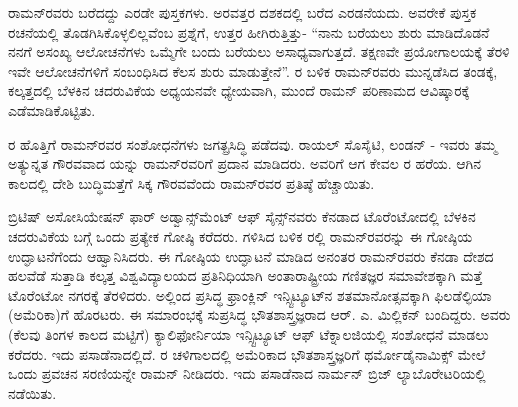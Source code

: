 ರಾಮನ್‍ರವರು ಬರೆದದ್ದು ಎರಡೇ ಪುಸ್ತಕಗಳು. ಅರವತ್ತರ ದಶಕದಲ್ಲಿ ಬರೆದ \textit{} ಎರಡನೆಯದು. ಅವರೇಕೆ ಪುಸ್ತಕ ರಚನೆಯಲ್ಲಿ ತೊಡಗಿಸಿಕೊಳ್ಳಲಿಲ್ಲವೆಂಬ ಪ್ರಶ್ನೆಗೆ, ಉತ್ತರ ಹೀಗಿರುತ್ತಿತ್ತು- “ನಾನು ಬರೆಯಲು ಶುರು ಮಾಡಿದೊಡನೆ ನನಗೆ ಅಸಂಖ್ಯ ಆಲೋಚನೆಗಳು ಒಮ್ಮೆಗೇ ಬಂದು ಬರೆಯಲು ಅಸಾಧ್ಯವಾಗುತ್ತದೆ. ತಕ್ಷಣವೇ ಪ್ರಯೋಗಾಲಯಕ್ಕೆ ತೆರಳಿ ಇವೇ ಆಲೋಚನೆಗಳಿಗೆ ಸಂಬಂಧಿಸಿದ ಕೆಲಸ ಶುರು ಮಾಡುತ್ತೇನೆ”. ರ ಬಳಿಕ ರಾಮನ್‍ರವರು ಮುನ್ನಡೆಸಿದ ತಂಡಕ್ಕೆ, ಕಲ್ಕತ್ತದಲ್ಲಿ ಬೆಳಕಿನ ಚದರುವಿಕೆಯ ಅಧ್ಯಯನವೇ ಧ್ಯೇಯವಾಗಿ, ಮುಂದೆ ರಾಮನ್ ಪರಿಣಾಮದ ಆವಿಷ್ಕಾರಕ್ಕೆ ಎಡೆಮಾಡಿಕೊಟ್ಟಿತು.

ರ ಹೊತ್ತಿಗೆ ರಾಮನ್‍ರವರ ಸಂಶೋಧನೆಗಳು ಜಗತ್ಪ್ರಸಿದ್ಧಿ ಪಡೆದವು. ರಾಯಲ್ ಸೊಸೈಟಿ, ಲಂಡನ್ - ಇವರು ತಮ್ಮ ಅತ್ಯುನ್ನತ ಗೌರವವಾದ  ಯನ್ನು ರಾಮನ್‍ರವರಿಗೆ ಪ್ರದಾನ ಮಾಡಿದರು. ಅವರಿಗೆ ಆಗ ಕೇವಲ ರ ಹರೆಯ. ಆಗಿನ ಕಾಲದಲ್ಲಿ ದೇಶಿ ಬುದ್ಧಿಮತ್ತೆಗೆ ಸಿಕ್ಕ ಗೌರವವೆಂದು ರಾಮನ್‍ರವರ ಪ್ರತಿಷ್ಠೆ ಹೆಚ್ಚಾಯಿತು.



ಬ್ರಿಟಿಷ್ ಅಸೋಸಿಯೇಷನ್ ಫಾರ್ ಅಡ್ವಾನ್ಸ್‌ಮೆಂಟ್ ಆಫ್ ಸೈನ್ಸ್‌ನವರು ಕೆನಡಾದ ಟೊರೆಂಟೋದಲ್ಲಿ ಬೆಳಕಿನ ಚದರುವಿಕೆಯ ಬಗ್ಗೆ ಒಂದು ಪ್ರತ್ಯೇಕ ಗೋಷ್ಠಿ ಕರೆದರು.  ಗಳಿಸಿದ ಬಳಿಕ ರಲ್ಲಿ ರಾಮನ್‍ರವರನ್ನು ಈ ಗೋಷ್ಠಿಯ ಉದ್ಘಾಟನೆಗೆಂದು ಆಹ್ವಾನಿಸಿದರು. ಈ ಗೋಷ್ಠಿಯ ಉದ್ಘಾಟನೆ ಮಾಡಿದ ಅನಂತರ ರಾಮನ್‍ರವರು ಕೆನಡಾ ದೇಶದ ಹಲವೆಡೆ ಸುತ್ತಾಡಿ ಕಲ್ಕತ್ತ ವಿಶ್ವವಿದ್ಯಾಲಯದ ಪ್ರತಿನಿಧಿಯಾಗಿ ಅಂತಾರಾಷ್ಟ್ರೀಯ ಗಣಿತಜ್ಞರ ಸಮಾವೇಶಕ್ಕಾಗಿ ಮತ್ತೆ ಟೊರೆಂಟೋ ನಗರಕ್ಕೆ ತೆರಳಿದರು. ಅಲ್ಲಿಂದ ಪ್ರಸಿದ್ಧ ಫ್ರಾಂಕ್ಲಿನ್ ಇನ್ಸ್ಟಿಟ್ಯೂಟ್‍ನ ಶತಮಾನೋತ್ಸವಕ್ಕಾಗಿ ಫಿಲಡೆಲ್ಫಿಯಾ (ಅಮೆರಿಕಾ)ಗೆ ಹೊರಟರು. ಈ ಸಮಾರಂಭಕ್ಕೆ ಸುಪ್ರಸಿದ್ಧ ಭೌತಶಾಸ್ತ್ರಜ್ಞರಾದ ಆರ್. ಎ. ಮಿಲ್ಲಿಕನ್ ಬಂದಿದ್ದರು. ಅವರು (ಕೆಲವು ತಿಂಗಳ ಕಾಲದ ಮಟ್ಟಿಗೆ) ಕ್ಯಾಲಿಫೋರ್ನಿಯಾ ಇನ್ಸ್ಟಿಟ್ಯೂಟ್ ಆಫ್ ಟೆಕ್ನಾಲಜಿಯಲ್ಲಿ ಸಂಶೋಧನೆ ಮಾಡಲು ಕರೆದರು. ಇದು ಪಸಾಡೆನಾದಲ್ಲಿದೆ. ರ ಚಳಿಗಾಲದಲ್ಲಿ ಅಮೆರಿಕಾದ ಭೌತಶಾಸ್ತ್ರಜ್ಞರಿಗೆ ಥರ್ಮೋಡೈನಾಮಿಕ್ಸ್ ಮೇಲೆ ಒಂದು ಪ್ರವಚನ ಸರಣಿಯನ್ನೇ ರಾಮನ್ ನೀಡಿದರು. ಇದು ಪಸಾಡೆನಾದ ನಾರ್ಮನ್ ಬ್ರಿಜ್ ಲ್ಯಾಬೊರೇಟರಿಯಲ್ಲಿ ನಡೆಯಿತು.


